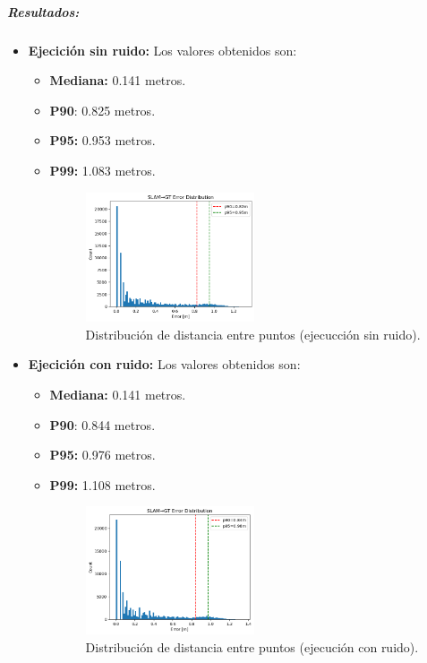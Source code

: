 \documentclass[12pt, a4paper, twoside]{article}
\begin{document}
\subparagraph{Resultados:}
\begin{itemize}
  \item \textbf{Ejecición sin ruido:} Los valores obtenidos son:
  \begin{itemize}
    \item \textbf{Mediana:} 0.141 metros. 
    \item \textbf{P90}: 0.825 metros.
    \item \textbf{P95:} 0.953 metros.
    \item \textbf{P99:} 1.083 metros.
    \begin{figure}[h]
      \centering
        \includegraphics[width=0.5\textwidth]{ed_clean.png}
        \caption{Distribución de distancia entre puntos (ejecucción sin ruido).}
    \end{figure} 
    \end{itemize}
  \item \textbf{Ejecición con ruido:} Los valores obtenidos son:
  \begin{itemize}
    \item \textbf{Mediana:} 0.141 metros. 
    \item \textbf{P90}: 0.844 metros.
    \item \textbf{P95:} 0.976 metros.
    \item \textbf{P99:} 1.108 metros.
    \begin{figure}[h]
      \centering
        \includegraphics[width=0.5\textwidth]{ed_noisy.png}
      \caption{Distribución de distancia entre puntos (ejecución con ruido).}
    \end{figure} 
  \end{itemize}
\end{itemize}
\end{document}
